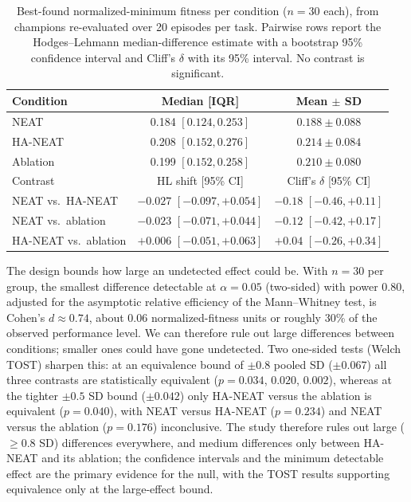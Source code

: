 \documentclass[12pt]{article}
\begin{document}
\begin{table}[h]
\centering
\caption{Best-found normalized-minimum fitness per condition ($n = 30$ each), from champions re-evaluated over 20 episodes per task. Pairwise rows report the Hodges--Lehmann median-difference estimate with a bootstrap 95\% confidence interval and Cliff's $\delta$ with its 95\% interval. No contrast is significant.}
\label{tab:main-fitness}
\begin{tabular}{lcc}
\toprule
Condition & Median [IQR] & Mean $\pm$ SD \\
\midrule
NEAT & 0.184 $[0.124, 0.253]$ & $0.188 \pm 0.088$ \\
HA-NEAT & 0.208 $[0.152, 0.276]$ & $0.214 \pm 0.084$ \\
Ablation & 0.199 $[0.152, 0.258]$ & $0.210 \pm 0.080$ \\
\midrule
Contrast & HL shift [95\% CI] & Cliff's $\delta$ [95\% CI] \\
\midrule
NEAT vs.\ HA-NEAT & $-0.027$ $[-0.097, +0.054]$ & $-0.18$ $[-0.46, +0.11]$ \\
NEAT vs.\ ablation & $-0.023$ $[-0.071, +0.044]$ & $-0.12$ $[-0.42, +0.17]$ \\
HA-NEAT vs.\ ablation & $+0.006$ $[-0.051, +0.063]$ & $+0.04$ $[-0.26, +0.34]$ \\
\bottomrule
\end{tabular}
\end{table}

The design bounds how large an undetected effect could be.
With $n = 30$ per group, the smallest difference detectable at $\alpha = 0.05$ (two-sided) with power 0.80, adjusted for the asymptotic relative efficiency of the Mann--Whitney test, is Cohen's $d \approx 0.74$, about 0.06 normalized-fitness units or roughly 30\% of the observed performance level.
We can therefore rule out large differences between conditions; smaller ones could have gone undetected.
Two one-sided tests (Welch TOST) sharpen this: at an equivalence bound of $\pm 0.8$ pooled SD ($\pm 0.067$) all three contrasts are statistically equivalent ($p = 0.034$, $0.020$, $0.002$), whereas at the tighter $\pm 0.5$ SD bound ($\pm 0.042$) only HA-NEAT versus the ablation is equivalent ($p = 0.040$), with NEAT versus HA-NEAT ($p = 0.234$) and NEAT versus the ablation ($p = 0.176$) inconclusive.
The study therefore rules out large ($\geq 0.8$ SD) differences everywhere, and medium differences only between HA-NEAT and its ablation; the confidence intervals and the minimum detectable effect are the primary evidence for the null, with the TOST results supporting equivalence only at the large-effect bound.
\end{document}
